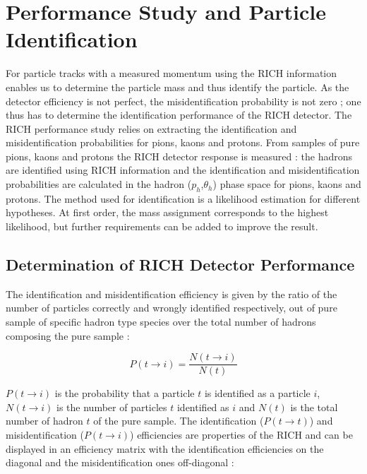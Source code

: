 
\chapter{Performance Study and Particle Identification}
\label{ch:PID} %


For particle tracks with a measured momentum using the RICH information enables us to determine the particle mass and thus identify the particle. As the detector efficiency is not perfect, the misidentification probability is not zero ; one thus has to determine the identification performance of the RICH detector. The RICH performance study relies on extracting the identification and misidentification probabilities for pions, kaons and protons. From samples of pure pions, kaons and protons the RICH detector response is measured : the hadrons are identified using RICH information and the identification and misidentification probabilities are calculated in the hadron ($p_h$,$\theta_h$) phase space for pions, kaons and protons. The method used for identification is a likelihood estimation for different hypotheses. At first order, the mass assignment corresponds to the highest likelihood, but further requirements can be added to improve the result.

\section{Determination of RICH Detector Performance}

The identification and misidentification efficiency is given by the ratio of the number of particles correctly and wrongly identified respectively, out of pure sample of specific hadron type species over the total number of hadrons composing the pure sample :

\begin{equation}
    P(t \rightarrow i) = \frac{N(t \rightarrow i)}{N(t)}
\end{equation}

$P(t \rightarrow i)$ is the probability that a particle $t$ is identified as a particle $i$, $N(t \rightarrow i)$ is the number of particles $t$ identified as $i$ and $N(t)$ is the total number of hadron $t$ of the pure sample. The identification ($P(t \rightarrow t)$) and misidentification ($P(t \rightarrow i)$) efficiencies are properties of the RICH and can be displayed in an efficiency matrix with the identification efficiencies on the diagonal and the misidentification ones off-diagonal :

